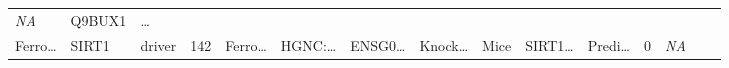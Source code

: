 \documentclass[
]{article}
\begin{document}
\begin{longtable}[]{@{}lllllllllllllll@{}}
\begin{minipage}[t]{0.05\columnwidth}
\emph{NA}\strut
\end{minipage} & \begin{minipage}[t]{0.05\columnwidth}\raggedright
Q9BUX1\strut
\end{minipage} & \begin{minipage}[t]{0.02\columnwidth}\raggedright
\ldots{}\strut
\end{minipage}\tabularnewline
\begin{minipage}[t]{0.05\columnwidth}\raggedright
Ferro\ldots{}\strut
\end{minipage} & \begin{minipage}[t]{0.05\columnwidth}\raggedright
SIRT1\strut
\end{minipage} & \begin{minipage}[t]{0.04\columnwidth}\raggedright
driver\strut
\end{minipage} & \begin{minipage}[t]{0.02\columnwidth}\raggedright
142\strut
\end{minipage} & \begin{minipage}[t]{0.05\columnwidth}\raggedright
Ferro\ldots{}\strut
\end{minipage} & \begin{minipage}[t]{0.05\columnwidth}\raggedright
HGNC:\ldots{}\strut
\end{minipage} & \begin{minipage}[t]{0.05\columnwidth}\raggedright
ENSG0\ldots{}\strut
\end{minipage} & \begin{minipage}[t]{0.05\columnwidth}\raggedright
Knock\ldots{}\strut
\end{minipage} & \begin{minipage}[t]{0.05\columnwidth}\raggedright
Mice\strut
\end{minipage} & \begin{minipage}[t]{0.05\columnwidth}\raggedright
SIRT1\ldots{}\strut
\end{minipage} & \begin{minipage}[t]{0.05\columnwidth}\raggedright
Predi\ldots{}\strut
\end{minipage} & \begin{minipage}[t]{0.05\columnwidth}\raggedright
0\strut
\end{minipage} & \begin{minipage}[t]{0.05\columnwidth}\raggedright
\emph{NA}\strut
\end{minipage} & \begin{minipage}[t]{0.05\columnwidth}\raggedright

\end{minipage}
\end{longtable}
\end{document}
